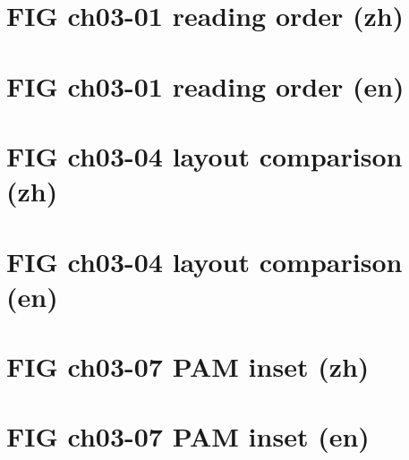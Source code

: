 \documentclass[UTF8,fontset=fandol,10pt]{ctexart}
\begin{document}
\section*{FIG ch03-01 reading order (zh)}

\newpage
\section*{FIG ch03-01 reading order (en)}

\newpage
\section*{FIG ch03-04 layout comparison (zh)}

\newpage
\section*{FIG ch03-04 layout comparison (en)}

\newpage
\section*{FIG ch03-07 PAM inset (zh)}

\newpage
\section*{FIG ch03-07 PAM inset (en)}

\end{document}
